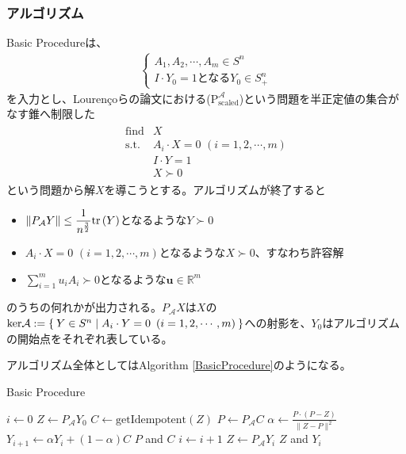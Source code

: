 \subsubsection{アルゴリズム}
Basic Procedureは、
\begin{align*}
  \begin{cases}
      A_1, A_2, \cdots, A_m \in S^n \\
      I \cdot Y_0 = 1 \text{となる} Y_0 \in S_+^n
    \end{cases}
\end{align*}
を入力とし、Louren\c{c}oらの論文における($\mathrm{P}_\mathrm{scaled}^\mathcal{A}$)という問題を半正定値の集合がなす錐へ制限した
\begin{align*}
  \begin{array}{ll}
    \text{find} & X \\
    \text{s.t.} & A_i \cdot X = 0 \,\, \left(i = 1, 2, \cdots, m\right) \\
                & I \cdot Y = 1 \\
                & X \succ 0
  \end{array}
\end{align*}
という問題から解$X$を導こうとする。アルゴリズムが終了すると
\begin{itemize}
  \item $\displaystyle{\|P_\mathcal{A} Y\| \leq \frac{1}{n^{\frac{3}{2}}} \mathrm{tr}\parenthesis(Y)}$となるような$Y \succ 0$
  \item $A_i \cdot X = 0 \,\, \left(i = 1, 2, \cdots, m\right)$となるような$X \succ 0$、すなわち許容解
  \item $\displaystyle{\sum_{i = 1}^m u_i A_i \succ 0}$となるような$\mathbf{u} \in \mathbb{R}^m$
\end{itemize}
のうちの何れかが出力される。$P_\mathcal{A} X$は$X$の$\mathrm{ker}\mathcal{A} := \Set{Y \in S^n | A_i \cdot Y = 0 \,\, \left(i = 1, 2, \cdots, m\right)}$への射影を、$Y_0$はアルゴリズムの開始点をそれぞれ表している。

アルゴリズム全体としてはAlgorithm \ref{BasicProcedure}のようになる。
\begin{algorithm}
  \caption{Basic Procedure}
  \label{BasicProcedure}
  \begin{algorithmic}[1]
    \State $i \leftarrow 0$
    \State $Z \leftarrow P_\mathcal{A} Y_0$
      \State $C \leftarrow \text{getIdempotent}\left(Z\right)$
      \State $P \leftarrow P_\mathcal{A} C$
        \State $\alpha \leftarrow \displaystyle{\frac{P \cdot \left(P - Z\right)}{\|Z - P\|^2}}$
        \State $Y_{i + 1} \leftarrow \alpha Y_i + \left(1 - \alpha\right) C$
      \Else
        \State \Return $P$ and $C$
      \EndIf
      \State $i \leftarrow i + 1$
      \State $Z \leftarrow P_\mathcal{A} Y_i$
    \EndWhile
    \State \Return $Z$ and $Y_i$
  \end{algorithmic}
\end{algorithm}

